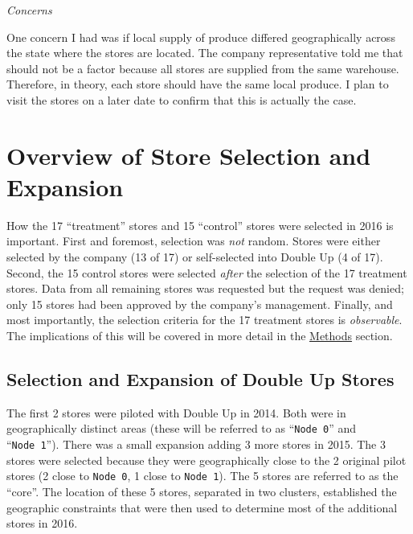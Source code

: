 \documentclass[12pt,letterpaperpaper,]{book}
\begin{document}
\emph{Concerns}

One concern I had was if local supply of produce differed geographically
across the state where the stores are located. The company
representative told me that should not be a factor because all stores
are supplied from the same warehouse. Therefore, in theory, each store
should have the same local produce. I plan to visit the stores on a
later date to confirm that this is actually the case.

\hypertarget{store-selection-1}{\section*{Overview of Store Selection
and Expansion}\label{store-selection-1}}

How the 17 ``treatment'' stores and 15 ``control'' stores were selected
in 2016 is important. First and foremost, selection was \emph{not}
random. Stores were either selected by the company (13 of 17) or
self-selected into Double Up (4 of 17). Second, the 15 control stores
were selected \emph{after} the selection of the 17 treatment stores.
Data from all remaining stores was requested but the request was denied;
only 15 stores had been approved by the company's management. Finally,
and most importantly, the selection criteria for the 17 treatment stores
is \emph{observable}. The implications of this will be covered in more
detail in the \protect\hyperlink{methods}{Methods} section.

\subsection*{Selection and Expansion of Double Up
Stores}\label{selection-and-expansion-of-double-up-stores}

The first 2 stores were piloted with Double Up in 2014. Both were in
geographically distinct areas (these will be referred to as
``\texttt{Node\ 0}'' and ``\texttt{Node\ 1}''). There was a small
expansion adding 3 more stores in 2015. The 3 stores were selected
because they were geographically close to the 2 original pilot stores (2
close to \texttt{Node\ 0}, 1 close to \texttt{Node\ 1}). The 5 stores
are referred to as the ``core''. The location of these 5 stores,
separated in two clusters, established the geographic constraints that
were then used to determine most of the additional stores in 2016.
\end{document}
